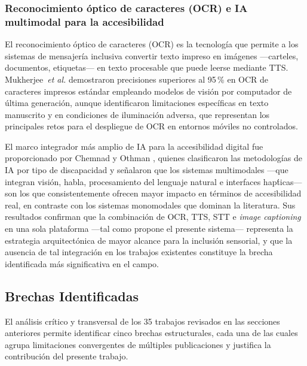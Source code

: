 \documentclass[journal]{IEEEtran}
\begin{document}
			\subsubsection{Reconocimiento \'optico de caracteres (OCR) e IA multimodal para la accesibilidad}
				El reconocimiento \'optico de caracteres (OCR) es la tecnolog\'ia que permite a los sistemas de mensajer\'ia inclusiva convertir texto impreso en im\'agenes ---carteles, documentos, etiquetas--- en texto procesable que puede leerse mediante TTS. Mukherjee~\textit{et al.} \cite{mukherjee2023} demostraron precisiones superiores al 95\,\% en OCR de caracteres impresos est\'andar empleando modelos de visi\'on por computador de \'ultima generaci\'on, aunque identificaron limitaciones espec\'ificas en texto manuscrito y en condiciones de iluminaci\'on adversa, que representan los principales retos para el despliegue de OCR en entornos m\'oviles no controlados.
				
				El marco integrador m\'as amplio de IA para la accesibilidad digital fue proporcionado por Chemnad y Othman \cite{chemnad2024}, quienes clasificaron las metodolog\'ias de IA por tipo de discapacidad y se\~nalaron que los sistemas multimodales ---que integran visi\'on, habla, procesamiento del lenguaje natural e interfaces hap\'ticas--- son los que consistentemente ofrecen mayor impacto en t\'erminos de accesibilidad real, en contraste con los sistemas monomodales que dominan la literatura. Sus resultados confirman que la combinaci\'on de OCR, TTS, STT e \textit{image captioning} en una sola plataforma ---tal como propone el presente sistema--- representa la estrategia arquitect\'onica de mayor alcance para la inclusi\'on sensorial, y que la ausencia de tal integraci\'on en los trabajos existentes constituye la brecha identificada m\'as significativa en el campo.
	
		\subsection{Brechas Identificadas}
			El an\'alisis cr\'itico y transversal de los 35 trabajos revisados en las secciones anteriores permite identificar cinco brechas estructurales, cada una de las cuales agrupa limitaciones convergentes de m\'ultiples publicaciones y justifica la contribuci\'on del presente trabajo.
			
\end{document}
